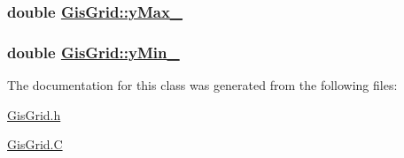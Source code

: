 \hypertarget{classGisGrid_o5}{
\subsubsection[yMax\_\-]{\setlength{\rightskip}{0pt plus 5cm}double \hyperlink{classGisGrid_o5}{Gis\-Grid::y\-Max\_\-}}}
\label{classGisGrid_o5}


\hypertarget{classGisGrid_o3}{
\subsubsection[yMin\_\-]{\setlength{\rightskip}{0pt plus 5cm}double \hyperlink{classGisGrid_o3}{Gis\-Grid::y\-Min\_\-}}}
\label{classGisGrid_o3}




The documentation for this class was generated from the following files:\begin{CompactItemize}
\item 
\hyperlink{GisGrid_8h}{Gis\-Grid.h}\item 
\hyperlink{GisGrid_8C}{Gis\-Grid.C}\end{CompactItemize}
